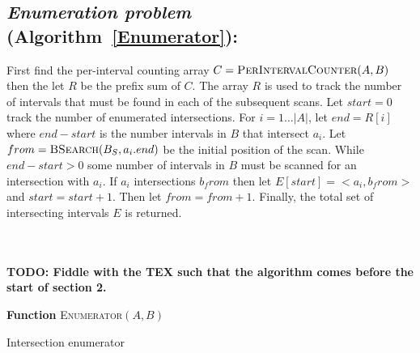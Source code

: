 \subsection{{\em Enumeration problem} (Algorithm~\ref{Enumerator}):} First find
the per-interval counting array
	 $C=\textsc{PerIntervalCounter}(A,B)$ then the let $R$ be the prefix sum
	 of $C$. The array $R$ is used to track the number of intervals that must be
	found in each of the subsequent scans.  Let $start = 0$ track the number of
	enumerated intersections.  For $i=1\dots|A|$, let $end = R[i]$ where $end -
	start$ is the number intervals in $B$ that intersect $a_i$.  Let
	$from=\textsc{BSearch}(B_S, a_i.end)$ be the initial position of the scan.
	While $end - start > 0$ some number of intervals in $B$ must be scanned for
	an intersection with $a_i$.  If $a_i$ intersections $b_from$ then let
	$E[start] = <a_i, b_from>$ and $start=start+1$.  Then let $from = from +1$.
	Finally, the total set of intersecting intervals $E$ is returned.
    
    \\
    \\
    \textbf{TODO: Fiddle with the TEX such that the algorithm comes before
    the start of section 2.}
    \\
    
	 \begin{algorithm}[h!]
		   \DontPrintSemicolon
		   \footnotesize
		    
		   \BlankLine
		   \textbf{Function} \textsc{Enumerator}$(A,B)$
		   \caption{Intersection enumerator}
			\label{Enumerator}
	 \end{algorithm}
